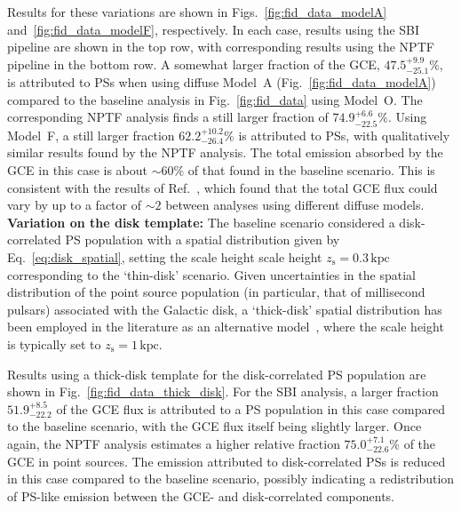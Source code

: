 \documentclass[prd,aps,10pt,nofootinbib,twocolumn,superscriptaddress,preprintnumbers,balancelastpage,longbibliography,floatfix]{revtex4-2}
\begin{document}
Results for these variations are shown in Figs.~\ref{fig:fid_data_modelA} and~\ref{fig:fid_data_modelF}, respectively. In each case, results using the SBI pipeline are shown in the top row, with corresponding results using the NPTF pipeline in the bottom row. 
A somewhat larger fraction of the GCE, $47.5^{+9.9}_{-25.1}\%$, is attributed to PSs when using diffuse {Model~A} (Fig.~\ref{fig:fid_data_modelA}) compared to the baseline analysis in Fig.~\ref{fig:fid_data} using {Model~O}. The corresponding NPTF analysis finds a still larger fraction of $74.9^{+6.6}_{-22.5}\%$. Using {Model~F}, a still larger fraction $62.2^{+10.2}_{-26.4}\%$ is attributed to PSs, with qualitatively similar results found by the NPTF analysis. The total emission absorbed by the GCE in this case is about $\sim 60\%$ of that found in the baseline scenario. This is consistent with the results of Ref.~\cite{Buschmann:2020adf}, which found that the total GCE flux could vary by up to a factor of $\sim 2$ between analyses using different diffuse models. \\

\noindent
\textbf{Variation on the disk template:}
The baseline scenario considered a disk-correlated PS population with a spatial distribution given by Eq.~\eqref{eq:disk_spatial}, setting the scale height scale height $z_\mathrm{s} = 0.3\,\mathrm{kpc}$ corresponding to the `thin-disk' scenario. Given uncertainties in the spatial distribution of the point source population (in particular, that of millisecond pulsars) associated with the Galactic disk, a `thick-disk' spatial distribution has been employed in the literature as an alternative model~\cite{Lee:2015fea,Leane:2019xiy,Buschmann:2020adf}, where the scale height is typically set to $z_\mathrm{s} = 1\,\mathrm{kpc}$. 

Results using a thick-disk template for the disk-correlated PS population are shown in Fig.~\ref{fig:fid_data_thick_disk}. For the SBI analysis, a larger fraction $51.9^{+8.5}_{-22.2}$ of the GCE flux is attributed to a PS population in this case compared to the baseline scenario, with the GCE flux itself being slightly larger. Once again, the NPTF analysis estimates a higher relative fraction $75.0^{+7.1}_{-22.6}\%$ of the GCE in point sources. The emission attributed to disk-correlated PSs is reduced in this case compared to the baseline scenario, possibly indicating a redistribution of PS-like emission between the GCE- and disk-correlated components. \\
\end{document}
